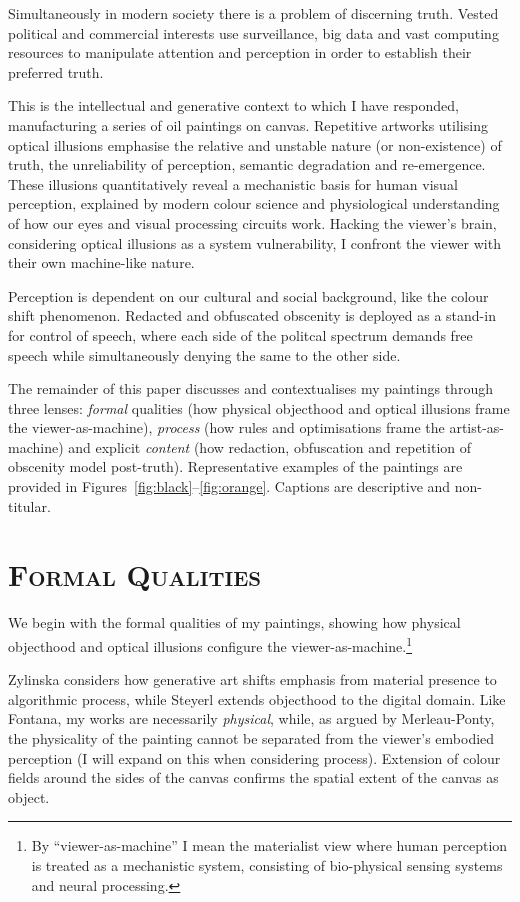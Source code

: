 \documentclass[12pt]{article}
\begin{document}
Simultaneously in modern society there is a problem of discerning
truth.\autocite{keyes2004posttruth,mcintyre2018posttruth} Vested
political and commercial interests use surveillance, big data and vast
computing resources to manipulate attention and perception in order to
establish their preferred truth.

This is the intellectual and generative context to which I have
responded, manufacturing a series of oil paintings on
canvas. Repetitive artworks utilising optical illusions emphasise the
relative and unstable nature (or non-existence) of truth, the
unreliability of perception, semantic degradation and
re-emergence. These illusions quantitatively reveal a mechanistic
basis for human visual perception, explained by modern colour science
and physiological understanding of how our eyes and visual processing
circuits work. Hacking the viewer's brain, considering optical
illusions as a system vulnerability, I confront the viewer with their
own machine-like nature.

Perception is dependent on our cultural and social background, like
the colour shift phenomenon. Redacted and obfuscated obscenity is
deployed as a stand-in for control of speech, where each side of the
politcal spectrum demands free speech while simultaneously denying the
same to the other side.

The remainder of this paper discusses and contextualises my paintings
through three lenses: \emph{formal} qualities (how physical objecthood
and optical illusions frame the viewer-as-machine), \emph{process}
(how rules and optimisations frame the artist-as-machine) and
explicit \emph{content} (how redaction, obfuscation and repetition of
obscenity model post-truth). Representative examples of the paintings
are provided in Figures~\ref{fig:black}--\ref{fig:orange}. Captions
are descriptive and non-titular.

\section{\textsc{Formal Qualities}}
We begin with the formal qualities of my paintings, showing how
physical objecthood and optical illusions configure the
viewer-as-machine.\footnote{By ``viewer-as-machine'' I mean the
  materialist view where human perception is treated as a mechanistic
  system, consisting of bio-physical sensing systems and neural
  processing.}


Zylinska considers how generative art shifts emphasis from material
presence to algorithmic process,\autocite{zylinska2020ai} while Steyerl
extends objecthood to the digital domain.\autocite{steyerl2017duty} Like
Fontana, my works are necessarily
\emph{physical},\autocite{fontana1947spatial} while, as argued by
Merleau-Ponty, the physicality of the painting cannot be separated
from the viewer's embodied perception (I will expand on this when
considering process).\autocite{merleauponty1964eye} Extension of colour
fields around the sides of the canvas confirms the spatial extent of
the canvas as object.
\end{document}
